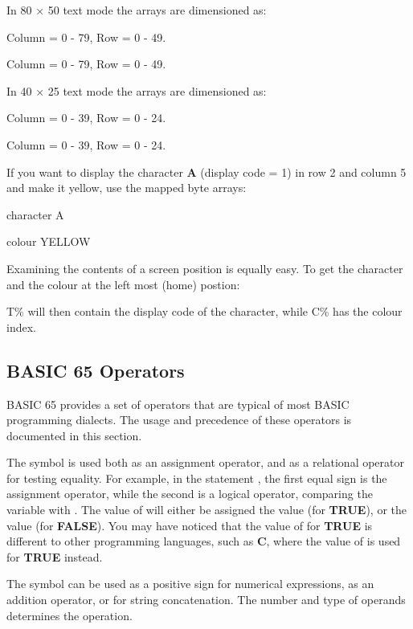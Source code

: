 In 80 $\times$ 50 text mode the arrays are dimensioned as:

 Column = 0 - 79, Row = 0 - 49.

 Column = 0 - 79, Row = 0 - 49.

In 40 $\times$ 25 text mode the arrays are dimensioned as:

 Column = 0 - 39, Row = 0 - 24.

 Column = 0 - 39, Row = 0 - 24.

If you want to display the character {\bf A} (display code = 1)
in row 2 and column 5 and make it yellow, use the mapped byte arrays:

 character A

 colour YELLOW

Examining the contents of a screen position is equally easy.
To get the character and the colour at the left most (home) postion:



T\% will then contain the display code of the character, while C\% has the colour index.


\subsection{BASIC 65 Operators}

BASIC 65 provides a set of operators that are typical of most BASIC
programming dialects. The usage and precedence of these operators is documented in this section.

The \screentext{=} symbol is used both as an assignment operator, and as a relational
operator for testing equality. For example, in the statement
, the first equal sign is the assignment operator,
while the second is a logical operator, comparing the variable  with .
The value of  will either be assigned the value  (for {\bf TRUE}), or
the value  (for {\bf FALSE}).
You may have noticed that the value of  for {\bf TRUE} is different to
other programming languages, such as {\bf C}, where the value of 
is used for {\bf TRUE} instead.

The \screentext{+} symbol can be used as a positive sign for numerical expressions,
as an addition operator, or for string concatenation. The number and type of operands
determines the operation.

